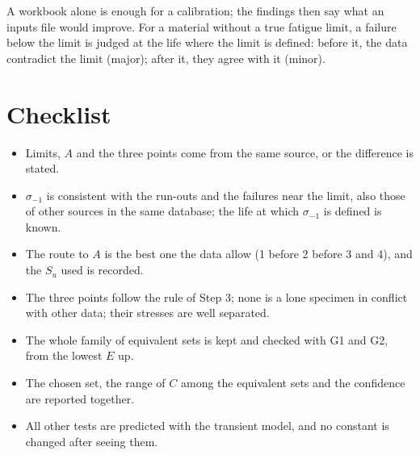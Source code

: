 \documentclass[11pt,a4paper]{article}
\newcommand{\sigm}{\sigma_{-1}}
\newcommand{\Su}{S_u}
\begin{document}
\begin{lesson}
A workbook alone is enough for a calibration; the findings then say what an inputs file would improve. For a
material without a true fatigue limit, a failure below the limit is judged at the life where the limit is defined:
before it, the data contradict the limit (major); after it, they agree with it (minor).
\end{lesson}

\FloatBarrier
\section{Checklist}
\begin{itemize}
\item Limits, $A$ and the three points come from the same source, or the difference is stated.
\item $\sigm$ is consistent with the run-outs and the failures near the limit, also those of other sources in the
  same database; the life at which $\sigm$ is defined is known.
\item The route to $A$ is the best one the data allow (1 before 2 before 3 and 4), and the $\Su$ used is recorded.
\item The three points follow the rule of Step 3; none is a lone specimen in conflict with other data; their stresses
  are well separated.
\item The whole family of equivalent sets is kept and checked with G1 and G2, from the lowest $E$ up.
\item The chosen set, the range of $C$ among the equivalent sets and the confidence are reported together.
\item All other tests are predicted with the transient model, and no constant is changed after seeing them.
\end{itemize}
\end{document}
